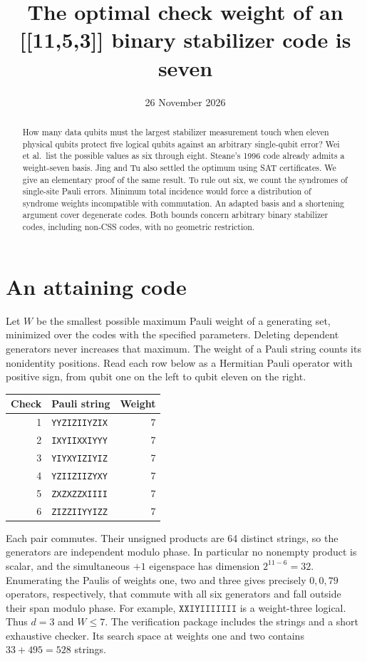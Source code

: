 \documentclass[11pt]{article}
\title{The optimal check weight of an [[11,5,3]] binary stabilizer code is seven}
\date{26 November 2026}
\begin{document}
\maketitle
\begin{abstract}
How many data qubits must the largest stabilizer measurement touch when eleven physical qubits protect five logical qubits against an arbitrary single-qubit error? Wei et al.\ list the possible values as six through eight. Steane’s 1996 code already admits a weight-seven basis. Jing and Tu also settled the optimum using SAT certificates. We give an elementary proof of the same result. To rule out six, we count the syndromes of single-site Pauli errors. Minimum total incidence would force a distribution of syndrome weights incompatible with commutation. An adapted basis and a shortening argument cover degenerate codes. Both bounds concern arbitrary binary stabilizer codes, including non-CSS codes, with no geometric restriction.
\end{abstract}
\section*{An attaining code}
Let $W$ be the smallest possible maximum Pauli weight of a generating set, minimized over the codes with the specified parameters. Deleting dependent generators never increases that maximum. The weight of a Pauli string counts its nonidentity positions. Read each row below as a Hermitian Pauli operator with positive sign, from qubit one on the left to qubit eleven on the right.
\begin{center}\begin{tabular}{rlr}\toprule
Check & Pauli string & Weight \\ \midrule
1 & \texttt{YYZIZIIYZIX} & 7\\
2 & \texttt{IXYIIXXIYYY} & 7\\
3 & \texttt{YIYXYIZIYIZ} & 7\\
4 & \texttt{YZIIZIIZYXY} & 7\\
5 & \texttt{ZXZXZZXIIII} & 7\\
6 & \texttt{ZIZZIIYYIZZ} & 7\\\bottomrule
\end{tabular}\end{center}
Each pair commutes. Their unsigned products are 64 distinct strings, so the generators are independent modulo phase. In particular no nonempty product is scalar, and the simultaneous $+1$ eigenspace has dimension $2^{11-6}=32$. Enumerating the Paulis of weights one, two and three gives precisely $0,0,79$ operators, respectively, that commute with all six generators and fall outside their span modulo phase. For example, $\mathtt{XXIYIIIIIII}$ is a weight-three logical. Thus $d=3$ and $W\le7$. The verification package includes the strings and a short exhaustive checker. Its search space at weights one and two contains $33+495=528$ strings.
\end{document}
